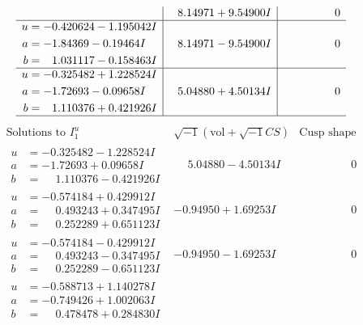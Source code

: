 \documentclass[1p]{elsarticle_modified}
\theoremstyle{definition}
\newcommand{\I}{\sqrt{-1}}
\begin{document}
$$\begin{array}{c|c|c}
 & \phantom{-}8.14971 + 9.54900 I & \phantom{-0.000000 } 0 \\ \hline\begin{aligned}
u &= -0.420624 - 1.195042 I \\
a &= -1.84369 - 0.19464 I \\
b &= \phantom{-}1.031117 - 0.158463 I\end{aligned}
 & \phantom{-}8.14971 - 9.54900 I & \phantom{-0.000000 } 0 \\ \hline\begin{aligned}
u &= -0.325482 + 1.228524 I \\
a &= -1.72693 - 0.09658 I \\
b &= \phantom{-}1.110376 + 0.421926 I\end{aligned}
 & \phantom{-}5.04880 + 4.50134 I & \phantom{-0.000000 } 0\\
 \hline 
 \end{array}$$\newpage$$\begin{array}{c|c|c}  
\text{Solutions to }I^u_{1}& \I (\text{vol} + \sqrt{-1}CS) & \text{Cusp shape}\\
 \hline 
\begin{aligned}
u &= -0.325482 - 1.228524 I \\
a &= -1.72693 + 0.09658 I \\
b &= \phantom{-}1.110376 - 0.421926 I\end{aligned}
 & \phantom{-}5.04880 - 4.50134 I & \phantom{-0.000000 } 0 \\ \hline\begin{aligned}
u &= -0.574184 + 0.429912 I \\
a &= \phantom{-}0.493243 + 0.347495 I \\
b &= \phantom{-}0.252289 + 0.651123 I\end{aligned}
 & -0.94950 + 1.69253 I & \phantom{-0.000000 } 0 \\ \hline\begin{aligned}
u &= -0.574184 - 0.429912 I \\
a &= \phantom{-}0.493243 - 0.347495 I \\
b &= \phantom{-}0.252289 - 0.651123 I\end{aligned}
 & -0.94950 - 1.69253 I & \phantom{-0.000000 } 0 \\ \hline\begin{aligned}
u &= -0.588713 + 1.140278 I \\
a &= -0.749426 + 1.002063 I \\
b &= \phantom{-}0.478478 + 0.284830 I\end{aligned}

\end{array}$$
\end{document}
